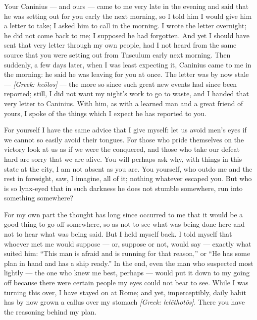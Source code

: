 

 Your Caninius --- and ours --- came to me very late in the evening and said that he was setting out for you early the next morning, so I told him I would give him a letter to take; I asked him to call in the morning. I wrote the letter overnight; he did not come back to me; I supposed he had forgotten. And yet I should have sent that very letter through my own people, had I not heard from the same source that you were setting out from Tusculum early next morning. Then suddenly, a few days later, when I was least expecting it, Caninius came to me in the morning: he said he was leaving for you at once. The letter was by now stale --- \textit{[Greek: heōlos]} --- the more so since such great new events had since been reported; still, I did not want my night's work to go to waste, and I handed that very letter to Caninius. With him, as with a learned man and a great friend of yours, I spoke of the things which I expect he has reported to you.

 For yourself I have the same advice that I give myself: let us avoid men's eyes if we cannot so easily avoid their tongues. For those who pride themselves on the victory look at us as if we were the conquered, and those who take our defeat hard are sorry that we are alive. You will perhaps ask why, with things in this state at the city, I am not absent as you are. You yourself, who outdo me and the rest in foresight, saw, I imagine, all of it; nothing whatever escaped you. But who is so lynx-eyed that in such darkness he does not stumble somewhere, run into something somewhere?

 For my own part the thought has long since occurred to me that it would be a good thing to go off somewhere, so as not to see what was being done here and not to hear what was being said. But I held myself back. I told myself that whoever met me would suppose --- or, suppose or not, would say --- exactly what suited him: ``This man is afraid and is running for that reason,'' or ``He has some plan in hand and has a ship ready.'' In the end, even the man who suspected most lightly --- the one who knew me best, perhaps --- would put it down to my going off because there were certain people my eyes could not bear to see. While I was turning this over, I have stayed on at Rome; and yet, imperceptibly, daily habit has by now grown a callus over my stomach \textit{[Greek: lelēthotōs]}. There you have the reasoning behind my plan.

